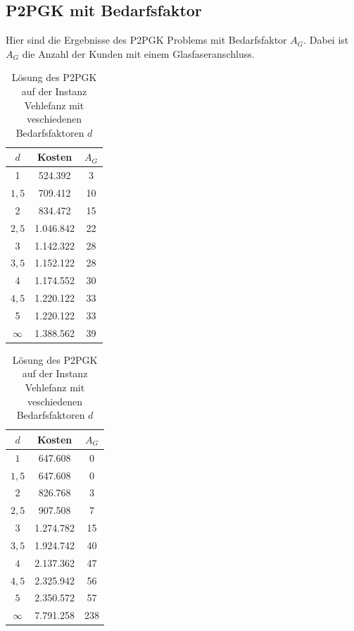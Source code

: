 \documentclass[11pt,a4paper]{article}
\theoremstyle{my_th_style1}
\begin{document}
\subsection*{P2PGK mit Bedarfsfaktor}
Hier sind die Ergebnisse des P2PGK Problems mit Bedarfsfaktor $A_G$. Dabei ist $A_G$ die Anzahl der Kunden mit einem Glasfaseranschluss.

\begin{table}[h]
	\centering
	\begin{minipage}{.35\textwidth}
		\centering
		\begin{tabular}{c|c|c}
			\centering
			\(d\) & Kosten & $A_G$ \\	
			\hline
			1& 524.392 & 3 \\
			\(1,5\) & 709.412 & 10 \\
			2 & 834.472 & 15 \\
			\(2,5\) & 1.046.842 & 22 \\
			3 & 1.142.322 & 28 \\
			\(3,5\) & 1.152.122 & 28 \\
			4 & 1.174.552 & 30 \\
			\(4,5\) & 1.220.122 & 33 \\	
			5 & 1.220.122 & 33 \\
			$\infty$ &  1.388.562 & 39 \\
		\end{tabular}
		\caption{Lösung des P2PGK auf der Instanz Berlin mit veschiedenen Bedarfsfaktoren \(d\)}
		\label{P2PGK_Berlin_Bedarf}
	\end{minipage}
	\hspace{0.5cm}
	\begin{minipage}{0.35\textwidth}
		\centering
		\begin{tabular}{c|c|c}
			\centering
			$d$ & Kosten & $A_G$ \\	
			\hline
			$1$   &   647.608 & 0  \\
			$1,5$ &   647.608 & 0  \\
			$2$   &   826.768 & 3  \\
			$2,5$ &   907.508 & 7  \\
			$3$   & 1.274.782 & 15 \\
			$3,5$ & 1.924.742 & 40 \\
			$4$   & 2.137.362 & 47 \\
			$4,5$ & 2.325.942 & 56 \\
			$5$   & 2.350.572 & 57 \\
			$\infty$ & 7.791.258 & 238 \\ 
		\end{tabular}
		\caption{Lösung des P2PGK auf der Instanz Vehlefanz mit veschiedenen Bedarfsfaktoren $d$}
		\label{P2PGK_Vehlefanz_Bedarf}
	\end{minipage}
\end{table}
\vspace{0.5cm}
\end{document}
